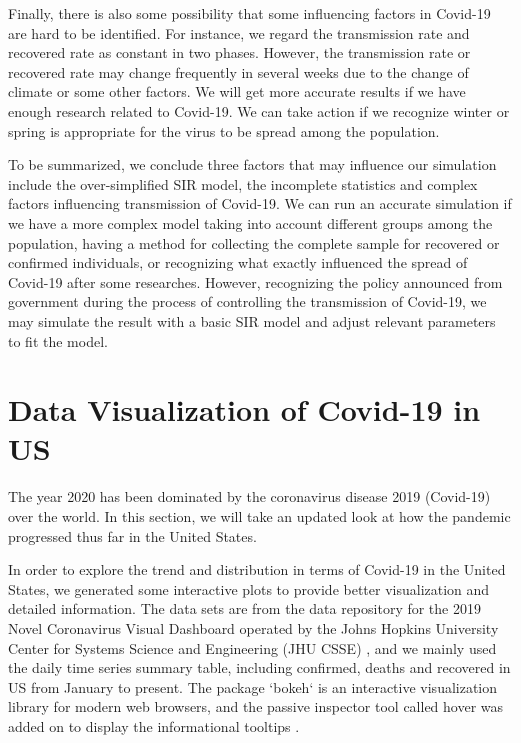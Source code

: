 \documentclass{article}
\begin{document}
Finally, there is also some possibility that some influencing factors in Covid-19 are hard to be identified. For instance, we regard the transmission rate and recovered rate as constant in two phases. However, the transmission rate or recovered rate may change frequently in several weeks due to the change of climate or some other factors. We will get more accurate results if we have enough research related to Covid-19. We can take action if we recognize winter or spring is appropriate for the virus to be spread among the population.


To be summarized, we conclude three factors that may influence our simulation include the over-simplified SIR model, the incomplete statistics and complex factors influencing transmission of Covid-19. We can run an accurate simulation if we have a more complex model taking into account different groups among the population, having a method for collecting the complete sample for recovered or confirmed individuals, or recognizing what exactly influenced the spread of Covid-19 after some researches. However, recognizing the policy announced from government during the process of controlling the transmission of Covid-19, we may simulate the result with a basic SIR model and adjust relevant parameters to fit the model. 










\section{Data Visualization of Covid-19 in US}

The year 2020 has been dominated by the coronavirus disease 2019 (Covid-19) over the world. In this section, we will take an updated look at how the pandemic progressed thus far in the United States.


In order to explore the trend and distribution in terms of Covid-19 in the United States, we generated some interactive plots to provide better visualization and detailed information. The data sets are from the data repository for the 2019 Novel Coronavirus Visual Dashboard operated by the Johns Hopkins University Center for Systems Science and Engineering (JHU CSSE) \cite{Johnhopkins}, and we mainly used the daily time series summary table, including confirmed, deaths and recovered in US from January to present. The package `bokeh` is an interactive visualization library for modern web browsers, and the passive inspector tool called hover was added on to display the informational tooltips \cite{bokeh}. 
\end{document}

